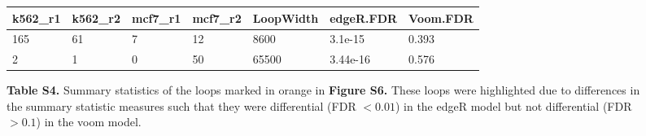 \documentclass{article}\usepackage[]{graphicx}\usepackage[]{color}
\newenvironment{knitrout}{}{} %
\begin{document}
\begin{figure}[h]
\begin{knitrout}
\color{fgcolor}
\begin{tabular}{l|l|l|l|l|l|l}
\hline
k562\_r1 & k562\_r2 & mcf7\_r1 & mcf7\_r2 & LoopWidth & edgeR.FDR & Voom.FDR\\
\hline
165 & 61 & 7 & 12 & 8600 & 3.1e-15 & 0.393\\
\hline
2 & 1 & 0 & 50 & 65500 & 3.44e-16 & 0.576\\
\hline
\end{tabular}


\end{knitrout}
\centering
\caption{\textbf{Table S4.} Summary statistics of the loops marked in orange in \textbf{Figure S6.} These loops were highlighted due to differences in the summary statistic measures such that they were differential (FDR $< 0.01$) in the edgeR model but not differential (FDR $> 0.1$) in the voom model.}
\end{figure} \clearpage
\end{document}
